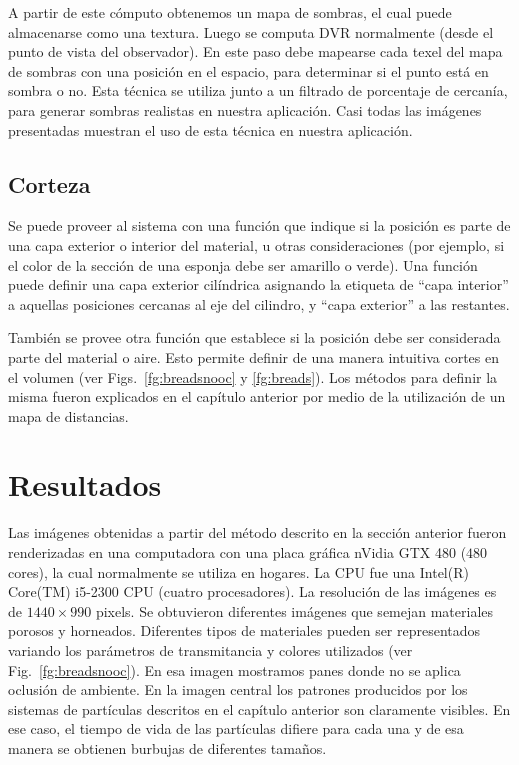 A partir de este cómputo obtenemos un mapa de sombras, el cual puede almacenarse como una textura.
Luego se computa DVR normalmente (desde el punto de vista del observador).
En este paso debe mapearse cada texel del mapa de sombras con una posición en el espacio, para determinar si el punto está en sombra o no.
Esta técnica se utiliza junto a un filtrado de porcentaje de cercanía, para generar sombras realistas en nuestra aplicación.
Casi todas las imágenes presentadas muestran el uso de esta técnica en nuestra aplicación.


\subsection{Corteza}
Se puede proveer al sistema con una función que indique si la posición es parte de una capa exterior o interior del material, u otras consideraciones (por ejemplo, si el color de la sección de una esponja debe ser amarillo o verde).
Una función puede definir una capa exterior cilíndrica asignando la etiqueta de ``capa interior'' a aquellas posiciones cercanas al eje del cilindro, y ``capa exterior'' a las restantes.

También se provee otra función que establece si la posición debe ser considerada parte del material o aire.
Esto permite definir de una manera intuitiva cortes en el volumen (ver Figs.~\ref{fg:breadsnooc} y \ref{fg:breads}).
Los métodos para definir la misma fueron explicados en el capítulo anterior por medio de la utilización de un mapa de distancias.


\section{Resultados}
Las imágenes obtenidas a partir del método descrito en la sección anterior fueron renderizadas en una computadora con una placa gráfica nVidia GTX 480 ($480$ cores), la cual normalmente se utiliza en hogares.
La CPU fue una Intel(R) Core(TM) i5-2300 CPU (cuatro procesadores).
La resolución de las imágenes es de $1440\times990$ pixels. 
Se obtuvieron diferentes imágenes que semejan materiales porosos y horneados.
Diferentes tipos de materiales pueden ser representados variando los parámetros de transmitancia y colores utilizados (ver Fig.~\ref{fg:breadsnooc}).
En esa imagen mostramos panes donde no se aplica oclusión de ambiente.
En la imagen central los patrones producidos por los sistemas de partículas descritos en el capítulo anterior son claramente visibles.
En ese caso, el tiempo de vida de las partículas difiere para cada una y de esa manera se obtienen burbujas de diferentes tamaños.


